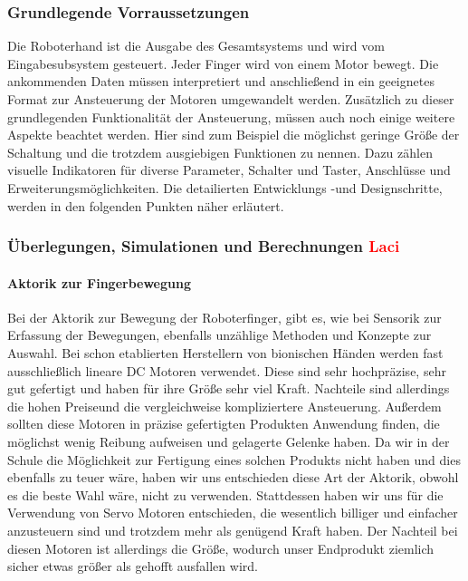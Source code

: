\documentclass[titlepage,12pt,twoside]{article}
\begin{document}
\subsubsection{Grundlegende Vorraussetzungen}
Die Roboterhand ist die Ausgabe des Gesamtsystems und wird vom Eingabesubsystem gesteuert. Jeder Finger wird von einem Motor 
bewegt. Die ankommenden Daten müssen interpretiert und anschließend in ein geeignetes Format zur Ansteuerung der Motoren
umgewandelt werden. Zusätzlich zu dieser grundlegenden Funktionalität der Ansteuerung, müssen auch noch einige weitere Aspekte
beachtet werden. Hier sind zum Beispiel die möglichst geringe Größe der Schaltung und die trotzdem ausgiebigen Funktionen 
zu nennen. Dazu zählen visuelle Indikatoren für diverse Parameter, Schalter und Taster, Anschlüsse und Erweiterungsmöglichkeiten.
Die detailierten Entwicklungs -und Designschritte, werden in den folgenden Punkten näher erläutert. \\

\subsubsection{Überlegungen, Simulationen und Berechnungen \textcolor{red}{Laci}}
\paragraph{Aktorik zur Fingerbewegung}
\hfill \break
\hfill \break
Bei der Aktorik zur Bewegung der Roboterfinger, gibt es, wie bei Sensorik zur Erfassung der Bewegungen, ebenfalls unzählige Methoden
und Konzepte zur Auswahl. Bei schon etablierten Herstellern von bionischen Händen werden fast ausschließlich lineare DC Motoren 
verwendet. Diese sind sehr hochpräzise, sehr gut gefertigt und haben für ihre Größe sehr viel Kraft. Nachteile sind allerdings
die hohen Preiseund die vergleichweise kompliziertere Ansteuerung. Außerdem sollten diese Motoren in präzise gefertigten Produkten
Anwendung finden, die möglichst wenig Reibung aufweisen und gelagerte Gelenke haben. Da wir in der Schule die Möglichkeit zur Fertigung 
eines solchen Produkts nicht haben und dies ebenfalls zu teuer wäre, haben wir uns entschieden diese Art der Aktorik, obwohl es die beste Wahl wäre,
nicht zu verwenden. Stattdessen haben wir uns für die Verwendung von Servo Motoren entschieden, die wesentlich billiger und einfacher anzusteuern sind und trotzdem mehr als
genügend Kraft haben. Der Nachteil bei diesen Motoren ist allerdings die Größe, wodurch unser Endprodukt ziemlich sicher etwas größer als gehofft
ausfallen wird. \\
\end{document}
